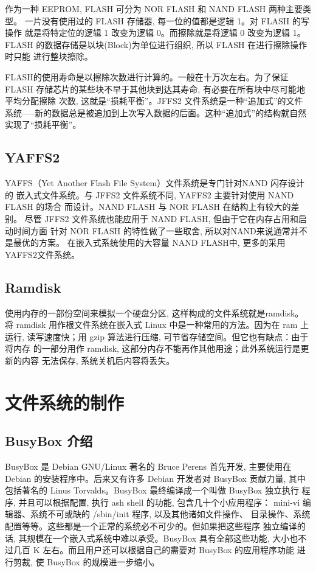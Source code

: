 	作为一种 EEPROM, FLASH 可分为 NOR FLASH 和 NAND FLASH 两种主要类型。
一片没有使用过的 FLASH 存储器, 每一位的值都是逻辑 1。对 FLASH 的写操作
就是将特定位的逻辑 1 改变为逻辑 0。而擦除就是将逻辑 0 改变为逻辑 1。FLASH
的数据存储是以块(Block)为单位进行组织, 所以 FLASH 在进行擦除操作时只能
进行整块擦除。

	FLASH的使用寿命是以擦除次数进行计算的。一般在十万次左右。为了保证 FLASH
存储芯片的某些块不早于其他块到达其寿命, 有必要在所有块中尽可能地平均分配擦除
次数, 这就是``损耗平衡''。JFFS2 文件系统是一种``追加式''的文件
系统-----新的数据总是被追加到上次写入数据的后面。这种``追加式''的结构就自然
实现了``损耗平衡''。

\subsection{YAFFS2}
	YAFFS（Yet Another Flash File System）文件系统是专门针对NAND 闪存设计的
嵌入式文件系统。与 JFFS2 文件系统不同, YAFFS2 主要针对使用 NAND FLASH 的场合
而设计。NAND FLASH 与 NOR FLASH 在结构上有较大的差别。
尽管 JFFS2 文件系统也能应用于 NAND FLASH, 但由于它在内存占用和启动时间方面
针对 NOR FLASH 的特性做了一些取舍, 所以对NAND来说通常并不是最优的方案。
在嵌入式系统使用的大容量 NAND FLASH中, 更多的采用YAFFS2文件系统。


\subsection{Ramdisk}
	使用内存的一部份空间来模拟一个硬盘分区, 这样构成的文件系统就是ramdisk。
将 ramdisk 用作根文件系统在嵌入式 Linux 中是一种常用的方法。因为在 ram 上运行, 
读写速度快；用 gzip 算法进行压缩, 可节省存储空间。但它也有缺点：由于将内存
的一部分用作 ramdisk, 这部分内存不能再作其他用途；此外系统运行是更新的内容
无法保存, 系统关机后内容将丢失。

\section{文件系统的制作}

\subsection{BusyBox 介绍}
	BusyBox 是 Debian GNU/Linux 著名的 Bruce Perens 首先开发, 主要使用在
Debian 的安装程序中。后来又有许多 Debian 开发者对 BusyBox 贡献力量, 其中
包括著名的 Linus Torvalds。BusyBox 最终编译成一个叫做 BusyBox 独立执行
程序, 并且可以根据配置, 执行 ash shell 的功能, 包含几十个小应用程序：
mini-vi 编辑器、系统不可或缺的 /sbin/init 程序, 以及其他诸如文件操作、
目录操作、系统配置等等。这些都是一个正常的系统必不可少的。但如果把这些程序
独立编译的话, 其规模在一个嵌入式系统中难以承受。BusyBox 具有全部这些功能, 
大小也不过几百 K 左右。而且用户还可以根据自己的需要对 BusyBox 的应用程序功能
进行剪裁, 使 BusyBox 的规模进一步缩小。

